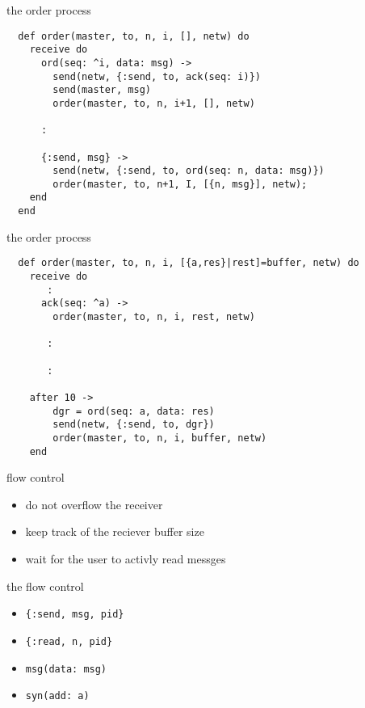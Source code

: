\begin{frame}[fragile]{the order process}

\begin{verbatim}
  def order(master, to, n, i, [], netw) do
    receive do
      ord(seq: ^i, data: msg) ->
        send(netw, {:send, to, ack(seq: i)})
        send(master, msg)
        order(master, to, n, i+1, [], netw)
        
      :
         
      {:send, msg} ->
        send(netw, {:send, to, ord(seq: n, data: msg)})
        order(master, to, n+1, I, [{n, msg}], netw);
    end
  end
\end{verbatim}
  
\end{frame}

\begin{frame}[fragile]{the order process}

\begin{verbatim}
  def order(master, to, n, i, [{a,res}|rest]=buffer, netw) do
    receive do
       :
      ack(seq: ^a) ->
        order(master, to, n, i, rest, netw)

       :

       :
                
    after 10 ->
        dgr = ord(seq: a, data: res)
        send(netw, {:send, to, dgr})
        order(master, to, n, i, buffer, netw)
    end
\end{verbatim}
\end{frame}

\begin{frame}{flow control}

 \begin{itemize}
  \item do not overflow the receiver \pause
  \item keep track of the reciever buffer size  \pause
  \item wait for the user to activly read messges \pause
\end{itemize}

\vspace{20pt}{\em We are introducing a synchronous interface - only send if receiver prepared.}

\end{frame}

\begin{frame}{the flow control}

  \begin{itemize}
  \item {\tt \{:send, msg, pid\}} 

  \item {\tt \{:read, n, pid\}} 


  \item {\tt msg(data: msg)}

  \item {\tt syn(add: a)}

      
\end{itemize}
  
\end{frame}

